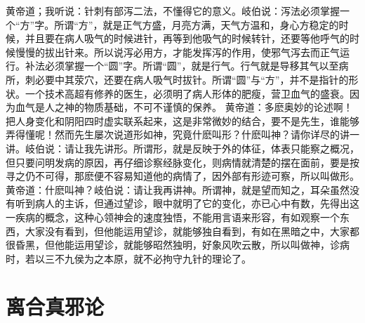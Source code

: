 \documentclass[a4paper,12pt,UTF8,twoside]{ctexbook}
\begin{document}
黄帝道；我听说：针刺有部泻二法，不懂得它的意义。岐伯说：泻法必须掌握一个“方”字。所谓“方”，就是正气方盛，月亮方满，天气方温和，身心方稳定的时候，并且要在病人吸气的时候进针，再等到他吸气的时候转针，还要等他呼气的时候慢慢的拔出针来。所以说泻必用方，才能发挥泻的作用，使邪气泻去而正气运行。补法必须掌握一个“圆”字。所谓“圆”，就是行气。行气就是导移其气以至病所，刺必要中其荥穴，还要在病人吸气时拔针。所谓“圆”与“方”，并不是指针的形状。一个技术高超有修养的医生，必须明了病人形体的肥瘦，营卫血气的盛衰。因为血气是人之神的物质基础，不可不谨慎的保养。
黄帝道：多麽奥妙的论述啊！把人身变化和阴阳四时虚实联系起来，这是非常微妙的结合，要不是先生，谁能够弄得懂呢！然而先生屡次说道形如神，究竟什麽叫形？什麽叫神？请你详尽的讲一讲。岐伯说：请让我先讲形。所谓形，就是反映于外的体征，体表只能察之概况，但只要问明发病的原因，再仔细诊察经脉变化，则病情就清楚的摆在面前，要是按寻之仍不可得，那麽便不容易知道他的病情了，因外部有形迹可察，所以叫做形。黄帝道：什麽叫神？岐伯说：请让我再讲神。所谓神，就是望而知之，耳朵虽然没有听到病人的主诉，但通过望诊，眼中就明了它的变化，亦已心中有数，先得出这一疾病的概念，这种心领神会的速度独悟，不能用言语来形容，有如观察一个东西，大家没有看到，但他能运用望诊，就能够独自看到，有如在黑暗之中，大家都很昏黑，但他能运用望诊，就能够昭然独明，好象风吹云散，所以叫做神，诊病时，若以三不九侯为之本原，就不必拘守九针的理论了。

\chapter{离合真邪论}
\end{document}
